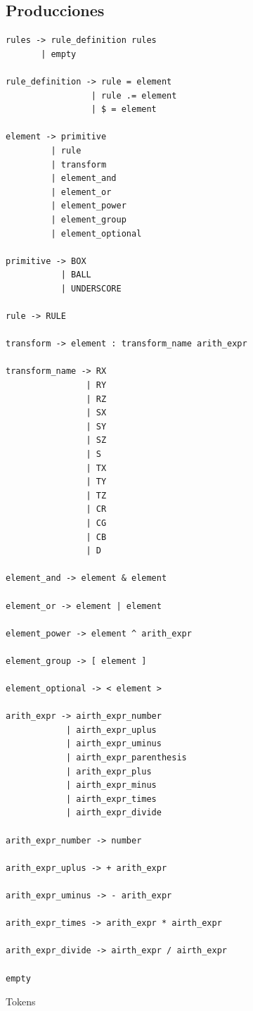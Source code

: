 \documentclass[a4paper, 10pt, twoside]{article}
\begin{document}
\subsection{Producciones}

\begin{verbatim}
rules -> rule_definition rules
       | empty

rule_definition -> rule = element
                 | rule .= element
                 | $ = element

element -> primitive
         | rule
         | transform
         | element_and
         | element_or
         | element_power
         | element_group
         | element_optional

primitive -> BOX
           | BALL
           | UNDERSCORE

rule -> RULE

transform -> element : transform_name arith_expr

transform_name -> RX
                | RY
                | RZ
                | SX
                | SY
                | SZ
                | S
                | TX
                | TY
                | TZ
                | CR
                | CG
                | CB
                | D

element_and -> element & element

element_or -> element | element

element_power -> element ^ arith_expr

element_group -> [ element ]

element_optional -> < element >

arith_expr -> airth_expr_number
            | airth_expr_uplus
            | airth_expr_uminus
            | airth_expr_parenthesis
            | arith_expr_plus
            | airth_expr_minus
            | airth_expr_times
            | airth_expr_divide

arith_expr_number -> number

arith_expr_uplus -> + arith_expr

arith_expr_uminus -> - arith_expr

arith_expr_times -> arith_expr * airth_expr

arith_expr_divide -> airth_expr / airth_expr

empty

\end{verbatim}

Tokens
\end{document}
